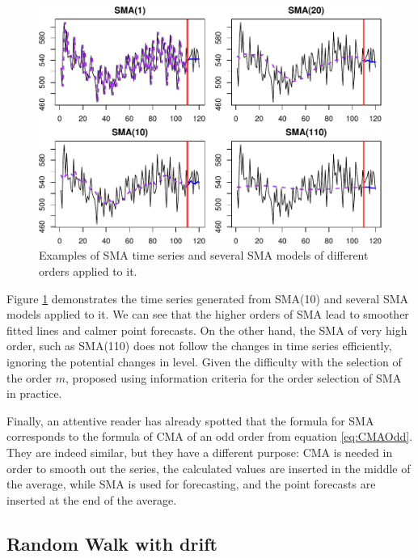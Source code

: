 \documentclass[
]{book}
\theoremstyle{definition}
\theoremstyle{definition}
\theoremstyle{definition}
\theoremstyle{definition}
\theoremstyle{remark}
\begin{document}
\begin{figure}
\centering
\includegraphics{adam_files/figure-latex/SMAExample-1.pdf}
\caption{\label{fig:SMAExample}Examples of SMA time series and several SMA models of different orders applied to it.}
\end{figure}

Figure \ref{fig:SMAExample} demonstrates the time series generated from SMA(10) and several SMA models applied to it. We can see that the higher orders of SMA lead to smoother fitted lines and calmer point forecasts. On the other hand, the SMA of very high order, such as SMA(110) does not follow the changes in time series efficiently, ignoring the potential changes in level. Given the difficulty with the selection of the order \(m\), \citet{Svetunkov2017} proposed using information criteria for the order selection of SMA in practice.

Finally, an attentive reader has already spotted that the formula for SMA corresponds to the formula of CMA of an odd order from equation \eqref{eq:CMAOdd}. They are indeed similar, but they have a different purpose: CMA is needed in order to smooth out the series, the calculated values are inserted in the middle of the average, while SMA is used for forecasting, and the point forecasts are inserted at the end of the average.

\hypertarget{RWWithDrift}{%
\subsection{Random Walk with drift}\label{RWWithDrift}}
\end{document}
